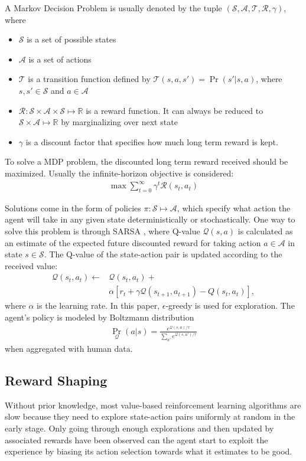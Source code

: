 \documentclass[letterpaper]{article} %
\begin{document}
A Markov Decision Problem is usually denoted by the tuple $(\mathcal{S}, \mathcal{A}, \mathcal{T}, \mathcal{R}, \gamma)$, where 
\begin{itemize}
    \item $\mathcal{S}$ is a set of possible states
    \item $\mathcal{A}$ is a set of actions
    \item $\mathcal{T}$ is a transition function defined by $\mathcal{T}(s, a, s')=\Pr(s'\vert s,a)$, where $s, s'\in \mathcal{S}$ and $a\in \mathcal{A}$
    \item $\mathcal{R}: \mathcal{S}\times \mathcal{A} \times \mathcal{S}\mapsto \mathbb{R}$ is a reward function. It can always be reduced to $\mathcal{S}\times \mathcal{A} \mapsto \mathbb{R}$ by marginalizing over next state
    \item $\gamma$ is a discount factor that specifies how much long term reward is kept.
\end{itemize}

To solve a MDP problem, the discounted long term reward received should be maximized. Usually the infinite-horizon objective is considered:
\begin{align}
\max \sum_{t=0}^{\infty}\gamma^t \mathcal{R}(s_t,a_t)
\end{align}

Solutions come in the form of policies $\pi: \mathcal{S} \mapsto \mathcal{A}$, which specify what action the agent will take in any given state deterministically or stochastically. One way to solve this problem is through SARSA \cite{sarsa}, where Q-value $\mathcal{Q}(s,a)$ is calculated as an estimate of the expected future discounted reward for taking action $a\in \mathcal{A}$ in state $s\in \mathcal{S}$. The Q-value of the state-action pair is updated according to the received value:
\begin{align}
\mathcal{Q}(s_t,a_t) \leftarrow &  \mathcal{Q}(s_t,a_t)+\nonumber \\ &\alpha[r_t+\gamma \mathcal{Q}(s_{t+1},a_{t+1})-Q(s_t,a_t)],
\end{align}
where $\alpha$ is the learning rate. In this paper, $\epsilon$-greedy is used for exploration. The agent's policy is modeled by Boltzmann distribution
\begin{align} \label{eq:2}
\Pr_\mathcal{Q}(a\vert s) = \frac{e^{\mathcal{Q}(s,a)/\tau}}{\sum_{a'}e^{\mathcal{Q}(s,a')/\tau}}
\end{align}
when aggregated with human data.
\subsection{Reward Shaping}
Without prior knowledge, most value-based reinforcement learning algorithms are slow because they need to explore state-action pairs uniformly at random in the early stage. Only going through enough explorations and then updated by associated rewards have been observed can the agent start to exploit the experience by biasing its action selection towards what it estimates to be good. 
\end{document}
